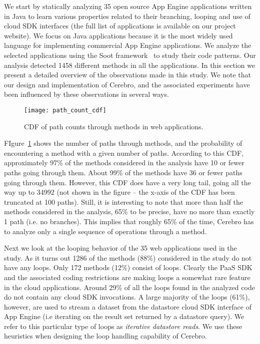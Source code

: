 We start by statically analyzing 35 open source App Engine applications written in Java to learn 
various properties related to their branching, looping and use of cloud SDK interfaces (the full list
of applications is available on our project website). We focus on
Java applications because it is the most widely used language for implementing
commercial App Engine applications. 
We analyze the selected applications
using the Soot framework~\cite{Vallee-Rai:2010:SJB:1925805.1925818} to study their code patterns. 
Our analysis detected 1458 different methods in all the
applications. In this section we present a detailed overview of the observations made in this study. We note that
our design and implementation of Cerebro, and the associated experiments have been influenced by 
these observations in several ways.

\begin{figure}
\centering
\texttt{[image: path\_count\_cdf]}
\caption{CDF of path counts through methods in web applications.}
\label{fig:path_count_cdf}
\end{figure}

FIgure~\ref{fig:path_count_cdf} shows the number of paths through methods, and the probability of encountering
a method with a given number of paths. According to this CDF, 
approximately 97\% of the methods considered in the analysis have 10 or fewer paths going through them. About 99\% of 
the methods have 36 or fewer paths going through them. However, this CDF does have a very long tail, going all the way
up to 34992 (not shown in the figure -- the x-axis of the CDF has been truncated at 100 paths). Still, it is interesting to note that more
than half the methods considered in the analysis, 65\% to be precise, have no more than exactly 1 path (i.e. no branches).
This implies that roughly 65\% of the time, Cerebro has to analyze only a single sequence of operations through a method. 

Next we look at the looping behavior of the 35 web applications used in the study. As it turns out 1286 of the methods (88\%)
considered in the study
do not have any loops. Only 172 methods (12\%) consist of loops. Clearly the PaaS SDK and the associated coding restrictions
are making loops a somewhat rare feature in the cloud applications. Around 29\% of all the loops found in 
the analyzed code do not contain any cloud SDK invocations. A large majority of the loops (61\%), however, are
used to stream a dataset from the datastore cloud SDK interface of App Engine (i.e iterating on the result set 
returned by a datastore query). We refer to this particular type of loops as \textit{iterative datastore reads}. 
We use these heuristics when designing the loop handling capability of Cerebro.

